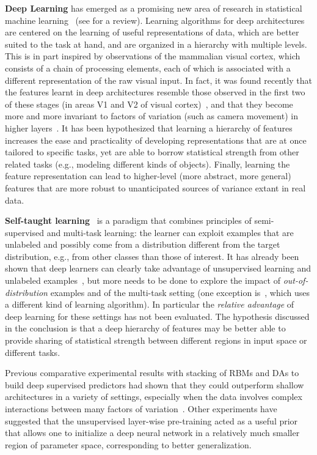 \documentclass{article} %
\begin{document}
{\bf Deep Learning} has emerged as a promising new area of research in
statistical machine learning~\citep{Hinton06}
(see \citet{Bengio-2009} for a review).
Learning algorithms for deep architectures are centered on the learning
of useful representations of data, which are better suited to the task at hand,
and are organized in a hierarchy with multiple levels.
This is in part inspired by observations of the mammalian visual cortex, 
which consists of a chain of processing elements, each of which is associated with a
different representation of the raw visual input. In fact,
it was found recently that the features learnt in deep architectures resemble
those observed in the first two of these stages (in areas V1 and V2
of visual cortex)~\citep{HonglakL2008}, and that they become more and
more invariant to factors of variation (such as camera movement) in
higher layers~\citep{Goodfellow2009}.
It has been hypothesized that learning a hierarchy of features increases the
ease and practicality of developing representations that are at once
tailored to specific tasks, yet are able to borrow statistical strength
from other related tasks (e.g., modeling different kinds of objects). Finally, learning the
feature representation can lead to higher-level (more abstract, more
general) features that are more robust to unanticipated sources of
variance extant in real data.

{\bf Self-taught learning}~\citep{RainaR2007} is a paradigm that combines principles
of semi-supervised and multi-task learning: the learner can exploit examples
that are unlabeled and possibly come from a distribution different from the target
distribution, e.g., from other classes than those of interest. 
It has already been shown that deep learners can clearly take advantage of
unsupervised learning and unlabeled examples~\citep{Bengio-2009,WestonJ2008-small},
but more needs to be done to explore the impact
of {\em out-of-distribution} examples and of the multi-task setting
(one exception is~\citep{CollobertR2008}, which uses a different kind
of learning algorithm). In particular the {\em relative
advantage} of deep learning for these settings has not been evaluated.
The hypothesis discussed in the conclusion is that a deep hierarchy of features
may be better able to provide sharing of statistical strength
between different regions in input space or different tasks.

Previous comparative experimental results with stacking of RBMs and DAs
to build deep supervised predictors had shown that they could outperform
shallow architectures in a variety of settings, especially
when the data involves complex interactions between many factors of 
variation~\citep{LarochelleH2007,Bengio-2009}. Other experiments have suggested
that the unsupervised layer-wise pre-training acted as a useful
prior~\citep{Erhan+al-2010} that allows one to initialize a deep
neural network in a relatively much smaller region of parameter space, 
corresponding to better generalization.
\end{document}
